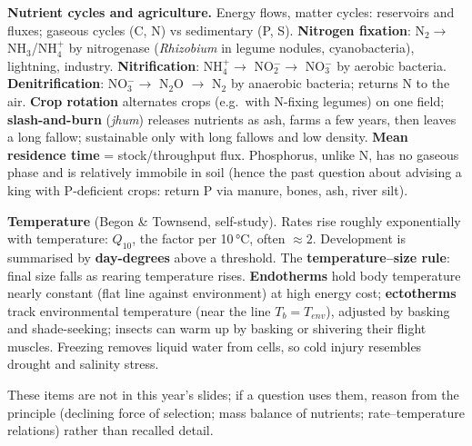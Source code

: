 \textbf{Nutrient cycles and agriculture.} Energy flows, matter cycles: reservoirs and fluxes; gaseous cycles (C, N) vs
sedimentary (P, S). \textbf{Nitrogen fixation}: N$_2\to$ NH$_3$/NH$_4^+$ by nitrogenase (\emph{Rhizobium} in legume
nodules, cyanobacteria), lightning, industry. \textbf{Nitrification}: NH$_4^+\to$ NO$_2^-\to$ NO$_3^-$ by aerobic
bacteria. \textbf{Denitrification}: NO$_3^-\to$ N$_2$O $\to$ N$_2$ by anaerobic bacteria; returns N to the air.
\textbf{Crop rotation} alternates crops (e.g.\ with N-fixing legumes) on one field; \textbf{slash-and-burn} (\emph{jhum})
releases nutrients as ash, farms a few years, then leaves a long fallow; sustainable only with long fallows and low density.
\textbf{Mean residence time} = stock/throughput flux. Phosphorus, unlike N, has no gaseous phase and is relatively
immobile in soil (hence the past question about advising a king with P-deficient crops: return P via manure, bones, ash,
river silt).

\textbf{Temperature} (Begon \& Townsend, self-study). Rates rise roughly exponentially with temperature: $Q_{10}$, the factor
per 10\,°C, often $\approx2$. Development is summarised by \textbf{day-degrees} above a threshold. The
\textbf{temperature--size rule}: final size falls as rearing temperature rises. \textbf{Endotherms} hold body temperature
nearly constant (flat line against environment) at high energy cost; \textbf{ectotherms} track environmental temperature
(near the line $T_b=T_{env}$), adjusted by basking and shade-seeking; insects can warm up by basking or shivering their
flight muscles. Freezing removes liquid water from cells, so cold injury resembles drought and salinity stress.

\begin{trap}
These items are not in this year's slides; if a question uses them, reason from the principle (declining force of selection;
mass balance of nutrients; rate--temperature relations) rather than recalled detail.
\end{trap}
